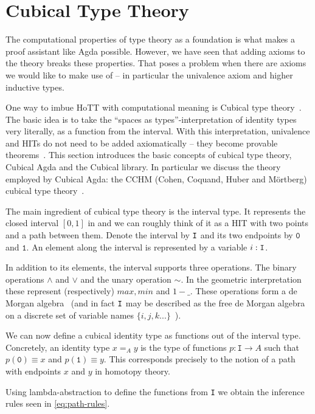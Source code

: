 \section{Cubical Type Theory}\label{sec:cubical}

The computational properties of type theory as a foundation is what makes a proof
assistant like Agda possible. However, we have seen that adding axioms to the
theory breaks these properties. That poses a problem when there are axioms we would
like to make use of -- in particular the univalence axiom and higher inductive types.

One way to imbue HoTT with computational meaning is Cubical type theory~\cite{cohen2016cubical}.
The basic idea is to take the ``spaces as types''-interpretation of identity types very literally, as
a function from the interval. With this interpretation, univalence and HITs do not need to
be added axiomatically -- they become provable theorems~\cite{coquand2018higher}.
This section introduces the basic concepts of cubical type theory, Cubical Agda and the
Cubical library. In particular we discuss the theory employed by Cubical Agda:
the CCHM (Cohen, Coquand, Huber and M\"ortberg) cubical type theory~\cite{cohen2016cubical}.

The main ingredient of cubical type theory is the interval type. It represents
the closed interval $[0,1]$ in and we can roughly think of it as a HIT with two points
and a path between them. Denote the interval by $\texttt{I}$ and its two
endpoints by $\texttt{0}$ and $\texttt{1}$. An element along the interval is
represented by a variable $i : \texttt{I}$.

In addition to its elements, the interval supports three operations. The binary
operations $\land$ and $\lor$ and the unary operation $\sim$. In the geometric
interpretation these represent (respectively) $max, min$ and $1 - \_$. These
operations form a de Morgan algebra~\cite{mortberg2020cubical} (and in fact
$\texttt{I}$ may be described as the free de Morgan algebra on a discrete set of
variable names $\{i, j, k ...\}$~\cite{cohen2016cubical}).

We can now define a cubical identity type as functions out of the interval type.
Concretely, an identity type $x =_A y$ is the type of functions $p : \texttt{I}
\rightarrow A$ such that $p(\texttt{0}) \equiv x$ and $p(\texttt{1}) \equiv y$.
This corresponds precisely to the notion of a path with endpoints $x$ and $y$ in
homotopy theory.

Using lambda-abstraction to define the functions from \texttt{I} we obtain the inference rules
seen in \autoref{eq:path-rules}.

